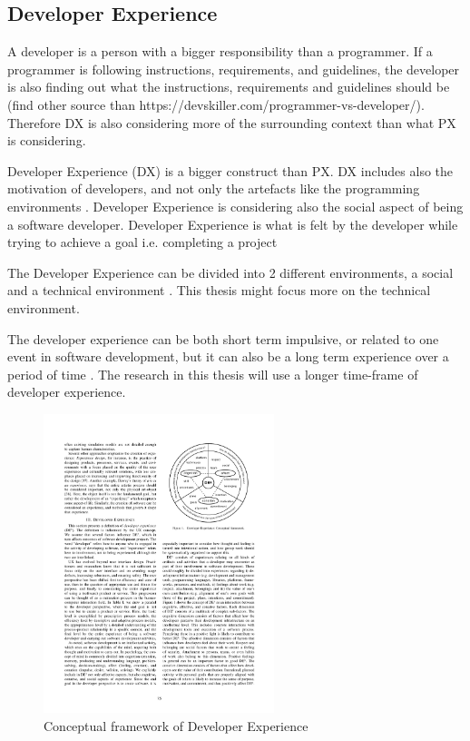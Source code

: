 \documentclass[english, 12pt, a4paper, sci, utf8, a-1b, online]{aaltothesis}
\begin{document}
\subsection{Developer Experience}

A developer is a person with a bigger responsibility than a programmer. If a programmer is following instructions, requirements, and guidelines, the developer is also finding out what the instructions, requirements and guidelines should be {\color{gray} (find other source than https://devskiller.com/programmer-vs-developer/).} Therefore DX is also considering more of the surrounding context than what PX is considering.

Developer Experience (DX) is a bigger construct than PX. DX includes also the motivation of developers, and not only the artefacts like the programming environments \citep{programmer-experience}. Developer Experience is considering also the social aspect of being a software developer. Developer Experience is what is felt by the developer while trying to achieve a goal i.e. completing a project

The Developer Experience can be divided into 2 different environments, a social and a technical environment \citep{fagerholm-doctoral-thesis}. This thesis might focus more on the technical environment.

The developer experience can be both short term impulsive, or related to one event in software development, but it can also be a long term experience over a period of time \citep{fagerholm-doctoral-thesis}. The research in this thesis will use a longer time-frame of developer experience.

\begin{figure}[H]
  \captionsetup{width=0.6\textwidth}
  \caption{Conceptual framework of Developer Experience \citep{fagerholm-dx-concept-and-definition}}
  \begin{center}
    \includegraphics[width=0.6\textwidth]{dx-conceptual.pdf}
  \end{center}
\end{figure}
\end{document}
